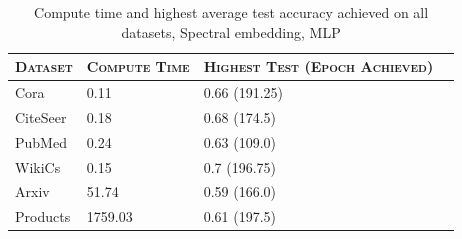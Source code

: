 \begin{table}\caption{Compute time and highest average test accuracy achieved on all datasets, Spectral embedding, MLP}\begin{center}\begin{tabular}{ | m{2cm} | m{2cm}| m{2cm} | m{2cm} }\hline\textsc{Dataset} & \textsc{Compute Time} & \textsc{Highest Test (Epoch Achieved)}\\\hline Cora & 0.11 & 0.66 (191.25)\\\hline CiteSeer & 0.18 & 0.68 (174.5)\\\hline PubMed & 0.24 & 0.63 (109.0)\\\hline WikiCs & 0.15 & 0.7 (196.75)\\\hline Arxiv & 51.74 & 0.59 (166.0)\\\hline Products & 1759.03 & 0.61 (197.5)\\\hline\end{tabular}\end{center}\end{table}